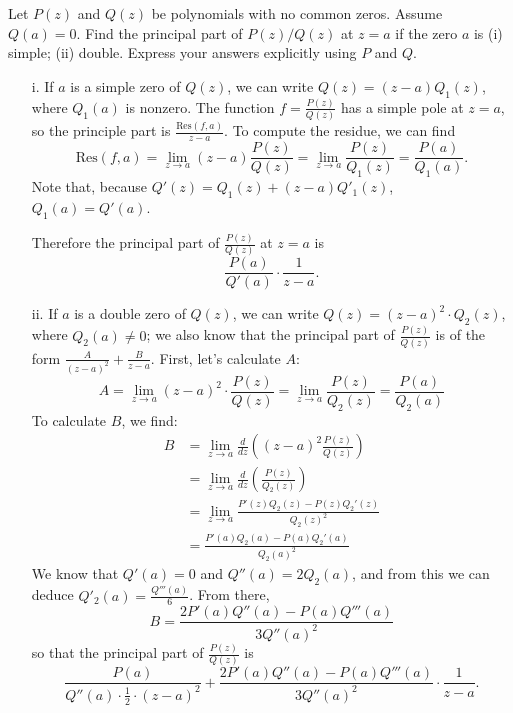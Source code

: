\documentclass[12pt]{article}
\begin{document}
\begin{statement}[3]
  Let $P(z)$ and $Q(z)$ be polynomials with no common zeros. Assume $Q(a)=0$. Find the principal part of 
  $P(z)/Q(z)$ at $z=a$ if the zero $a$ is (i) simple; (ii) double. Express your answers explicitly using $P$ and $Q$. 
\end{statement}
\begin{newproof}
  \begin{itemize}
    \item[i.] If $a$ is a simple zero of $Q(z)$, we can write $Q(z)=(z-a)Q_1(z)$, where $Q_1(a)$ is nonzero. The function $f = \frac{P(z)}{Q(z)}$ has a simple pole at $z=a$, so the principle part is $\frac{\text{Res}(f,a)}{z-a}$. To compute the residue, we can find 
    $$ \text{Res}(f,a)=\lim_{z \to a} (z-a) \frac{P(z)}{Q(z)} = \lim_{z \to a}\frac{P(z)}{Q_1(z)}=\frac{P(a)}{Q_1(a)}.$$
    Note that, because $ Q'(z)=Q_1(z)+(z-a)Q'_1(z) $, $Q_1(a)=Q'(a)$.
    \par Therefore the principal part of $\frac{P(z)}{Q(z)}$ at $z=a$ is 
    $$ \frac{P(a)}{Q'(a)} \cdot \frac{1}{z-a}.$$
    \item[ii.] If $a$ is a double zero of $Q(z)$, we can write $Q(z)=(z-a)^2 \cdot Q_2(z)$, where $Q_2(a) \neq 0$; we also know that the principal part of $\frac{P(z)}{Q(z)}$ is of the form $\frac{A}{(z-a)^2}+\frac{B}{z-a}$.
    First, let's calculate $A$:
    $$ A=\lim_{z \to a}(z-a)^2 \cdot \frac{P(z)}{Q(z)} = \lim_{z \to a} \frac{P(z)}{Q_2(z)} = \frac{P(a)}{Q_2(a)}$$
    To calculate $B$, we find:
    \begin{align*}
        B &= \lim_{z \to a} \frac{d}{dz} \left( (z-a)^2 \frac{P(z)}{Q(z)} \right) \\
        &= \lim_{z \to a} \frac{d}{dz} \left(\frac{P(z)}{Q_2(z)} \right) \\
        &= \lim_{z \to a} \frac{P'(z)Q_2(z)-P(z)Q_2'(z)}{Q_2(z)^2} \\
        &= \frac{P'(a)Q_2(a)-P(a)Q_2'(a)}{Q_2(a)^2}
    \end{align*}
    We know that $Q'(a)=0$ and $Q''(a)=2Q_2(a)$, and from this we can deduce $Q'_2(a)=\frac{Q'''(a)}{6}$.
    From there, 
    $$ B = \frac{2P'(a)Q''(a)-P(a)Q'''(a)}{3Q''(a)^2}$$
    so that the principal part of $\frac{P(z)}{Q(z)}$ is 
    $$ \frac{P(a)}{Q''(a) \cdot \frac{1}{2} \cdot (z-a)^2} + \frac{2P'(a)Q''(a)-P(a)Q'''(a)}{3Q''(a)^2} \cdot \frac{1}{z-a}.$$
  \end{itemize}
\end{newproof}

\end{document}
